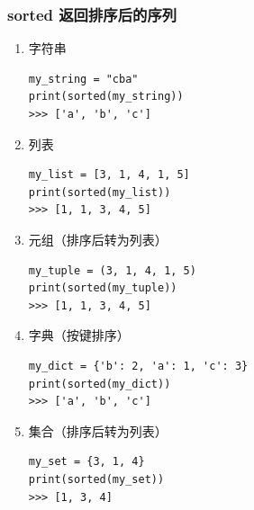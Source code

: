 \subsubsection{sorted 返回排序后的序列}
\begin{enumerate}[label=\arabic*)]
    \item 字符串
\begin{lstlisting}[style=demostyle,numbers=none]
my_string = "cba"
print(sorted(my_string))  
>>> ['a', 'b', 'c']
\end{lstlisting}

    \item 列表
\begin{lstlisting}[style=demostyle,numbers=none]
my_list = [3, 1, 4, 1, 5]
print(sorted(my_list))  
>>> [1, 1, 3, 4, 5]
\end{lstlisting}

    \item 元组（排序后转为列表）
\begin{lstlisting}[style=demostyle,numbers=none]
my_tuple = (3, 1, 4, 1, 5)
print(sorted(my_tuple))  
>>> [1, 1, 3, 4, 5]
\end{lstlisting}

    \item 字典（按键排序）
\begin{lstlisting}[style=demostyle,numbers=none]
my_dict = {'b': 2, 'a': 1, 'c': 3}
print(sorted(my_dict))
>>> ['a', 'b', 'c']
\end{lstlisting}

    \item 集合（排序后转为列表）
\begin{lstlisting}[style=demostyle,numbers=none]
my_set = {3, 1, 4}
print(sorted(my_set))
>>> [1, 3, 4]
\end{lstlisting}
\end{enumerate}

